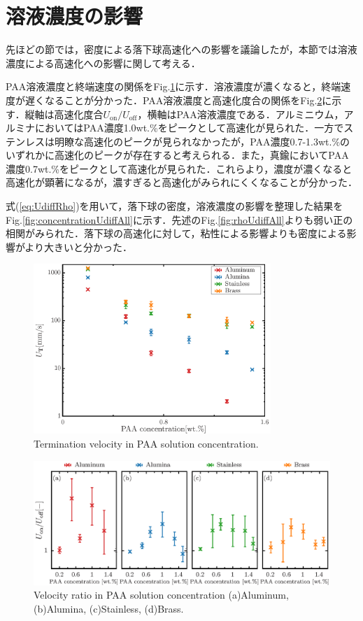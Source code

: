 \section{溶液濃度の影響}

先ほどの節では，密度による落下球高速化への影響を議論したが，本節では溶液濃度による高速化への影響に関して考える．

PAA溶液濃度と終端速度の関係をFig.\ref{fig:concentrationUT}に示す．溶液濃度が濃くなると，終端速度が遅くなることが分かった．PAA溶液濃度と高速化度合の関係をFig.\ref{fig:concentrationUdiff}に示す．縦軸は高速化度合$U_\text{on}/U_\text{off}$，横軸はPAA溶液濃度である．アルミニウム，アルミナにおいてはPAA濃度1.0wt.\%をピークとして高速化が見られた．一方でステンレスは明瞭な高速化のピークが見られなかったが，PAA濃度0.7-1.3wt.\%のいずれかに高速化のピークが存在すると考えられる．また，真鍮においてPAA濃度0.7wt.\%をピークとして高速化が見られた．これらより，濃度が濃くなると高速化が顕著になるが，濃すぎると高速化がみられにくくなることが分かった．

式(\ref{eq:UdiffRho})を用いて，落下球の密度，溶液濃度の影響を整理した結果をFig.\ref{fig:concentrationUdiffAll}に示す．先述のFig.\ref{fig:rhoUdiffAll}よりも弱い正の相関がみられた．落下球の高速化に対して，粘性による影響よりも密度による影響がより大きいと分かった．

\begin{figure}[ht]
    \centering
    \includegraphics[width=0.8\textwidth]{./5-Results/concentrationUT.eps}
    \caption{Termination velocity in PAA solution concentration.}
    \label{fig:concentrationUT}
\end{figure}

\begin{figure}[ht]
    \centering
    \includegraphics[width=1.0\textwidth]{./5-Results/concentrationUdiff.eps}
    \caption{Velocity ratio in PAA solution concentration (a)Aluminum, (b)Alumina, (c)Stainless, (d)Brass.}
    \label{fig:concentrationUdiff}
\end{figure}

